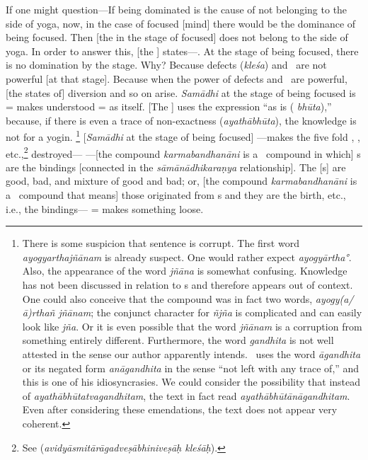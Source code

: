 If%
 one might question---If being dominated is the cause of not belonging to the side of yoga, now, in the case of focused [mind] there would be the dominance of being focused.  Then [the \samadhi\/ in the stage of focused] does not belong to the side of yoga.  In order to answer this, [the \Bhasyakara]
states---. %
%
At the stage of being focused, there is no domination by the stage.  Why?  Because defects (\emph{kleśa}) and \karman\ are not powerful [at that stage].
Because when the power of defects and \karman\ are powerful, [the states of] diversion and so on arise.   \emph{Samādhi\/} at the stage of being focused is  = makes  understood  = as
itself. [The \Bhasyakara] uses the expression ``as is (\emph{%
  bhūta}),'' because, if there is even a trace of non-exactness (\emph{a\-yathābhūta}), the knowledge is not for a yogin.%
  \footnote{%
	There is some suspicion that sentence is corrupt. The first word \emph{ayogyarthajñānam} is already suspect. One would rather expect \emph{ayogyārtha°}. Also, the appearance of the word \emph{jñāna} is somewhat confusing. Knowledge has not been discussed in relation to \cittabhumi s and therefore appears out of context. One could also conceive that the compound was in fact two words, \emph{ayogy(a/ā)rthañ jñānam}; the conjunct character for \emph{ñjña} is complicated and can easily look like \emph{jña}. Or it is even possible that the word \emph{jñānam} is a corruption from something entirely different. Furthermore, the word \emph{gandhita} is not well attested in the sense our author apparently intends. \Sankara\ uses the word \emph{āgandhita} or its negated form \emph{anāgandhita} in the sense ``not left with any trace of,'' and this is one of his idiosyncrasies. We could consider the possibility that instead of \emph{ayathābhūtatvagandhitam}, the text in fact read \emph{ayathābhūtānāgandhitam}. Even after considering these emendations, the text does not appear very coherent.%
  }  [\emph{Samādhi\/} at the stage of being focused] ---makes the five fold , \ignorance, etc.,\footnote{See  (\emph{avidyāsmitārāgadveṣābhiniveṣāḥ kleśāḥ}).} destroyed---
  ---[the compound \emph{karmabandhanāni\/} is a \KD\ compound in which] \karman s are the bindings [connected in the \emph{sāmānādhikaraṇya\/} relationship]. The [\karman s] are good, bad, and mixture of good and bad; or, [the compound \emph{karmabandhanāni\/} is a \TP\ compound that means] those originated from \karman s and they are the birth, etc., i.e., the bindings--- = makes something loose. %
